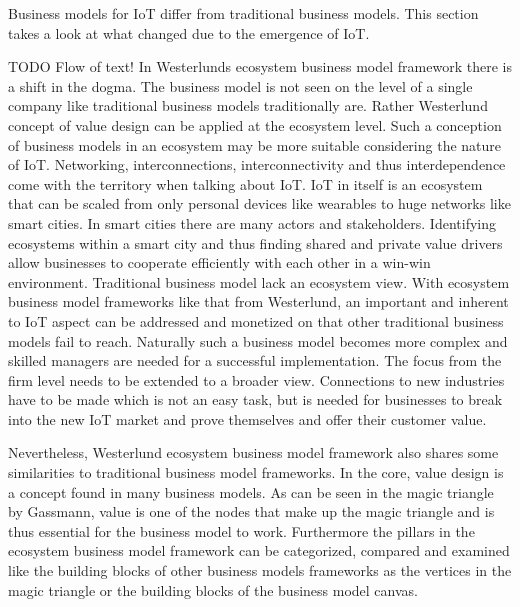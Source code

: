 	Business models for IoT differ from traditional business models. This section takes a look at what changed due to the emergence of IoT.

	TODO Flow of text! In Westerlunds ecosystem business model framework there is a shift in the dogma. The business model is not seen on the level of a single company like traditional business models traditionally are. Rather Westerlund concept of value design can be applied at the ecosystem level. Such a conception of business models in an ecosystem may be more suitable considering the nature of IoT. Networking, interconnections, interconnectivity and thus interdependence come with the territory when talking about IoT. IoT in itself is an ecosystem that can be scaled from only personal devices like wearables to huge networks like smart cities. In smart cities there are many actors and stakeholders. Identifying ecosystems within a smart city and thus finding shared and private value drivers allow businesses to cooperate efficiently with each other in a win-win environment. Traditional business model lack an ecosystem view. With ecosystem business model frameworks like that from Westerlund, an important and inherent to IoT aspect can be addressed and monetized on that other traditional business models fail to reach. Naturally such a business model becomes more complex and skilled managers are needed for a successful implementation. The focus from the firm level needs to be extended to a broader view. Connections to new industries have to be made which is not an easy task, but is needed for businesses to break into the new IoT market and prove themselves and offer their customer value.

	Nevertheless, Westerlund ecosystem business model framework also shares some similarities to traditional business model frameworks. In the core, value design is a concept found in many business models. As can be seen in the magic triangle by Gassmann, value is one of the nodes that make up the magic triangle and is thus essential for the business model to work. Furthermore the pillars in the ecosystem business model framework can be categorized, compared and examined like the building blocks of other business models frameworks as the vertices in the magic triangle or the building blocks of the business model canvas.


